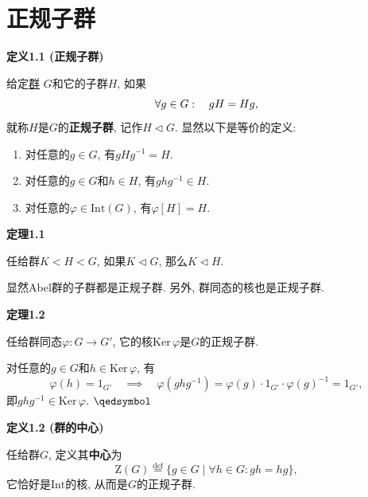 \documentclass[UTF8]{ctexart}
\begin{document}
\setlength{\abovedisplayskip}{1pt}
\setlength{\belowdisplayskip}{1pt}

\section{正规子群}

\hypertarget{sec:定义1.1}{}
\noindent\textbf{定义1.1 (正规子群)}

给定\href{01 半群与群#nameddest=sec:定义2.1}{群} $G$和它的子群$H$, 如果
\vspace{-3pt}
\[
    \forall g\in G:\quad gH=Hg,\\[-3pt]
\]
就称$H$是$G$的\textbf{正规子群}, 记作$H\lhd G$. 显然以下是等价的定义:
\begin{enumerate}
    \item 对任意的$g\in G$, 有$gHg^{-1}=H$.
    \item 对任意的$g\in G$和$h\in H$, 有$ghg^{-1}\in H$.
    \item 对任意的$\varphi\in\mathrm{Int}(G)$, 有$\varphi[H]=H$.
\end{enumerate}

\vspace{10pt}

\hypertarget{sec:定理1.1}{}
\noindent\textbf{定理1.1}

任给群$K<H<G$, 如果$K\lhd G$, 那么$K\lhd H$.

\vspace{10pt}

显然Abel群的子群都是正规子群. 另外, 群同态的核也是正规子群.

\vspace{10pt}

\hypertarget{sec:定理1.2}{}
\noindent\textbf{定理1.2}

任给群同态$\varphi:G\to G'$, 它的核$\mathrm{Ker}\,\varphi$是$G$的正规子群.


对任意的$g\in G$和$h\in\mathrm{Ker}\,\varphi$, 有
\[
    \varphi(h)=1_{G'}\quad\implies\quad
    \varphi(ghg^{-1})=\varphi(g)\cdot1_{G'}\cdot\varphi(g)^{-1}=1_{G'},
\]
即$ghg^{-1}\in\mathrm{Ker}\,\varphi$. \hfill $\qedsymbol$

\vspace{10pt}

\hypertarget{sec:定义1.2}{}
\noindent\textbf{定义1.2 (群的中心)}

任给群$G$, 定义其\textbf{中心}为
\[
    \mathrm{Z}(G)\overset{\mathrm{def}}{=}\{g\in G\mid\forall h\in G:gh=hg\},
\]
它恰好是$\mathrm{Int}$的核, 从而是$G$的正规子群.
\end{document}

